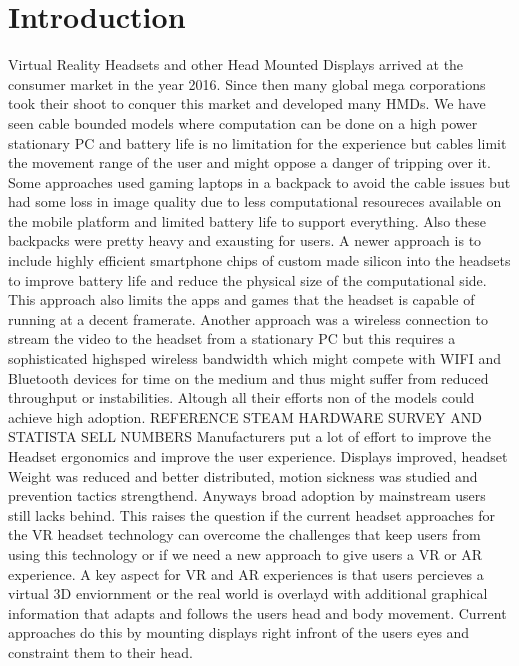 
\chapter{Introduction}\label{chapter:introduction}
Virtual Reality Headsets and other Head Mounted Displays arrived at the consumer market in the year 2016.
Since then many global mega corporations took their shoot to conquer this market and developed many HMDs.
We have seen cable bounded models where computation can be done on a high power stationary PC and battery life is no limitation for the experience but cables limit the movement range of the user and might oppose a danger of tripping over it.
Some approaches used gaming laptops in a backpack to avoid the cable issues but had some loss in image quality due to less computational resoureces available on the mobile platform and limited battery life to support everything.
Also these backpacks were pretty heavy and exausting for users.
A newer approach is to include highly efficient smartphone chips of custom made silicon into the headsets to improve battery life and reduce the physical size of the computational side.
This approach also limits the apps and games that the headset is capable of running at a decent framerate.
Another approach was a wireless connection to stream the video to the headset from a stationary PC but this requires a sophisticated highsped wireless bandwidth which might compete with WIFI and Bluetooth devices for time on the medium and thus might suffer from reduced throughput or instabilities.
Altough all their efforts non of the models could achieve high adoption.
REFERENCE STEAM HARDWARE SURVEY AND STATISTA SELL NUMBERS
Manufacturers put a lot of effort to improve the Headset ergonomics and improve the user experience.
Displays improved, headset Weight was reduced and better distributed, motion sickness was studied and prevention tactics strengthend.
Anyways broad adoption by mainstream users still lacks behind.
This raises the question if the current headset approaches for the VR headset technology can overcome the challenges that keep users from using this technology or if we need a new approach to give users a VR or AR experience.
A key aspect for VR and AR experiences is that users percieves a virtual 3D enviornment or the real world is overlayd with additional graphical information that adapts and follows the users head and body movement.
Current approaches do this by mounting displays right infront of the users eyes and constraint them to their head.
